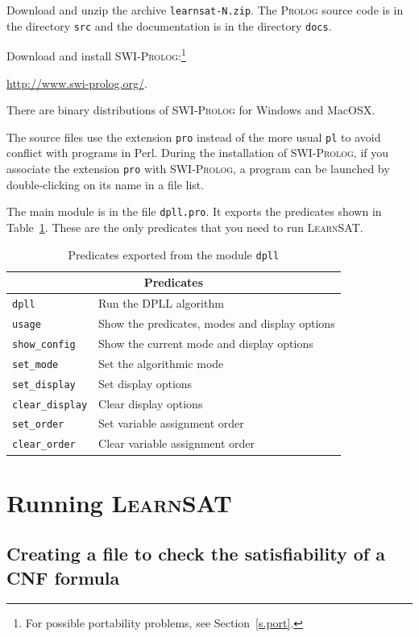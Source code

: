 \documentclass[11pt]{report}
\newcommand*{\p}[1]{\textup{\texttt{#1}}}
\newcommand*{\ls}{\textsc{LearnSAT}}
\newcommand*{\pl}{\textsc{Prolog}}
\newcommand*{\sw}{\textsc{SWI-Prolog}}
\begin{document}
Download and unzip the archive \p{learnsat-N.zip}. The \pl{} source code
is in the directory \p{src} and the documentation is in the directory
\p{docs}.

Download and install \sw{}:\footnote{For possible portability problems,
see Section~\ref{s.port}.}
\begin{center}
\url{http://www.swi-prolog.org/}.
\end{center}
There are binary distributions of \sw{} for Windows and MacOSX.

The source files use the extension \p{pro} instead of the more usual
\p{pl} to avoid conflict with programs in Perl. During the installation
of \sw{}, if you associate the extension \p{pro} with \sw{}, a
program can be launched by double-clicking on its name in a file list. 

The main module is in the file \p{dpll.pro}. It exports the predicates
shown in Table~\ref{tab.export}. These are the only predicates that you
need to run \ls{}.

\begin{table}
\begin{center}
\begin{tabular}{|l|l|}
\hline
\multicolumn{2}{|c|}{\textbf{\large Predicates}}\\
\hline
\p{dpll}&Run the DPLL algorithm\\
\p{usage}&Show the predicates, modes and display options \\
\p{show\_config}&Show the current mode and display options\\
\p{set\_mode}&Set the algorithmic mode\\
\p{set\_display}&Set display options\\
\p{clear\_display}&Clear display options\\
\p{set\_order}&Set variable assignment order\\
\p{clear\_order}&Clear variable assignment order\\
\hline
\end{tabular}
\end{center}
\caption{Predicates exported from the module \p{dpll}}\label{tab.export}
\end{table}


\section{Running \ls}

\subsection{Creating a file to check the satisfiability of a CNF formula}
\end{document}
